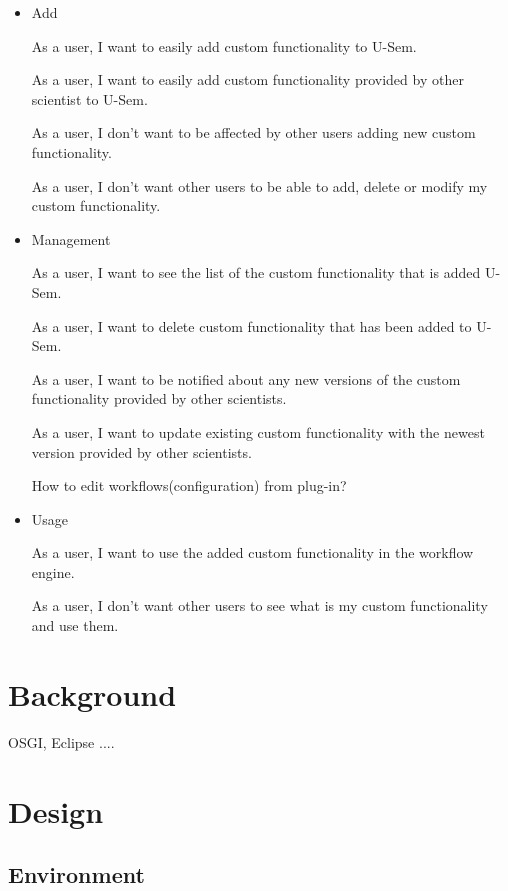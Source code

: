 \begin{itemize}
	\item Add
	
	As a user, I want to easily add custom functionality to U-Sem.
	
	As a user, I want to easily add custom functionality provided by other scientist to U-Sem.
	
	As a user, I don't want to be affected by other users adding new custom functionality.
	
	As a user, I don't want other users to be able to add, delete or modify my custom functionality.
	

	\item Management
	
	As a user, I want to see the list of the custom functionality that is added U-Sem.
	
	As a user, I want to delete custom functionality that has been added to U-Sem.
	
	As a user, I want to be notified about any new versions of the custom functionality provided by other scientists.
	
	As a user, I want to update existing custom functionality with the newest version provided by other scientists.
	
	How to edit workflows(configuration) from plug-in?
	
	\item Usage
	
	As a user, I want to use the added custom functionality in the workflow engine.
	
	As a user, I don't want other users to see what is my custom functionality and use them.

	
\end{itemize}


\section{Background}

OSGI, Eclipse ....

\section{Design}

\subsection{Environment}


